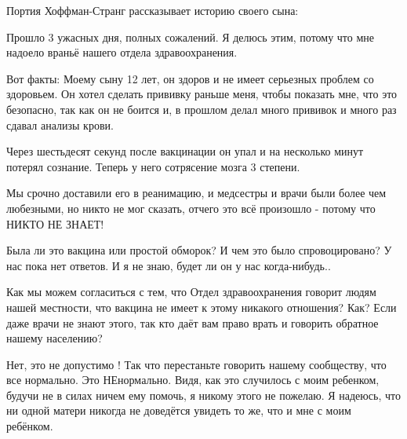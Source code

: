 Портия Хоффман-Странг рассказывает историю своего сына:

Прошло 3 ужасных дня, полных сожалений. Я делюсь этим, потому что мне надоело
враньё нашего отдела здравоохранения.

Вот факты: Моему сыну 12 лет, он здоров и не имеет серьезных проблем со
здоровьем. Он хотел сделать прививку раньше меня, чтобы показать мне, что это
безопасно, так как он не боится и, в прошлом делал много прививок и много раз
сдавал анализы крови.

Через шестьдесят секунд после вакцинации он упал и на несколько минут потерял
сознание. Теперь у него сотрясение мозга 3 степени.

Мы срочно доставили его в реанимацию, и медсестры и врачи были более чем
любезными, но никто не мог сказать, отчего это всё произошло - потому что НИКТО
НЕ ЗНАЕТ!

Была ли это вакцина или простой обморок? И чем это было спровоцировано? У нас
пока нет ответов. И я не знаю, будет ли он у нас когда-нибудь..

Как мы можем согласиться с тем, что Отдел здравоохранения говорит людям нашей
местности, что вакцина не имеет к этому никакого отношения? Как? Если даже врачи
не знают этого, так кто даёт вам право врать и говорить обратное нашему
населению?

Нет, это не допустимо ! Так что перестаньте говорить нашему сообществу, что все
нормально. Это НЕнормально. Видя, как это случилось с моим ребенком, будучи не в
силах ничем ему помочь, я никому этого не пожелаю. Я надеюсь, что ни одной
матери никогда не доведётся увидеть то же, что и мне с моим ребёнком.

